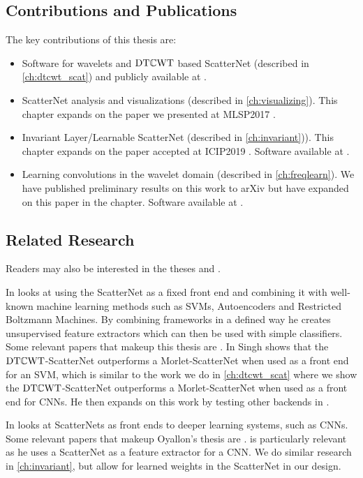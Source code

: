 \subsection{Contributions and Publications}
The key contributions of this thesis are:

\begin{itemize}
  \item Software for wavelets and $\mathrm{DT}\mathbb{C}\mathrm{WT}$ based ScatterNet (described in \autoref{ch:dtcwt_scat})
    and publicly available at \cite{cotter_pytorch_2018}.
  \item ScatterNet analysis and visualizations (described in
    \autoref{ch:visualizing}). This chapter expands on the paper we presented at MLSP2017
    \cite{cotter_visualizing_2017}.
  \item Invariant Layer/Learnable ScatterNet (described in \autoref{ch:invariant})). This chapter expands
    on the paper accepted at ICIP2019 \cite{cotter_learnable_2019}. Software
    available at \cite{cotter_learnable_2019-1}.
  \item Learning convolutions in the wavelet domain (described in
    \autoref{ch:freqlearn}). We have published preliminary results on this work
    to arXiv \cite{cotter_deep_2018} but have expanded on this paper in the
    chapter. Software available at \cite{cotter_dtcwt_2018}.
\end{itemize}

\subsection{Related Research}
Readers may also be interested in the theses \cite{singh_scatternet_2018} and
\cite{oyallon_analyzing_2017}.

In \cite{singh_scatternet_2018}
\citeauthor{singh_scatternet_2018} looks at using the ScatterNet as a fixed
front end and combining it with well-known machine learning methods such as
SVMs, Autoencoders and Restricted Boltzmann Machines. By combining frameworks in
a defined way he creates unsupervised feature extractors which can then be used
with simple classifiers. Some relevant papers that makeup this thesis are \cite{singh_multi-resolution_2016,
singh_scatternet_2017, singh_generative_2018}. In
\cite{singh_multi-resolution_2016} Singh shows
that the $\mathrm{DT}\mathbb{C}\mathrm{WT}$-ScatterNet outperforms a Morlet-ScatterNet when used as a front end for
an SVM, which is similar to the work we do in \autoref{ch:dtcwt_scat} where we
show the $\mathrm{DT}\mathbb{C}\mathrm{WT}$-ScatterNet outperforms a Morlet-ScatterNet when used as a
front end for CNNs. He then expands on this work by testing other backends in
\cite{singh_scatternet_2017, singh_generative_2018}.

In \cite{oyallon_analyzing_2017}
\citeauthor{oyallon_analyzing_2017} looks at ScatterNets as front ends to
deeper learning systems, such as CNNs. Some relevant papers that makeup Oyallon's thesis are
\cite{oyallon_deep_2015, oyallon_scaling_2017}. \cite{oyallon_scaling_2017}
is particularly relevant as he uses a ScatterNet as a feature extractor for a
CNN. We do similar research in \autoref{ch:invariant}, but allow for
learned weights in the ScatterNet in our design.
